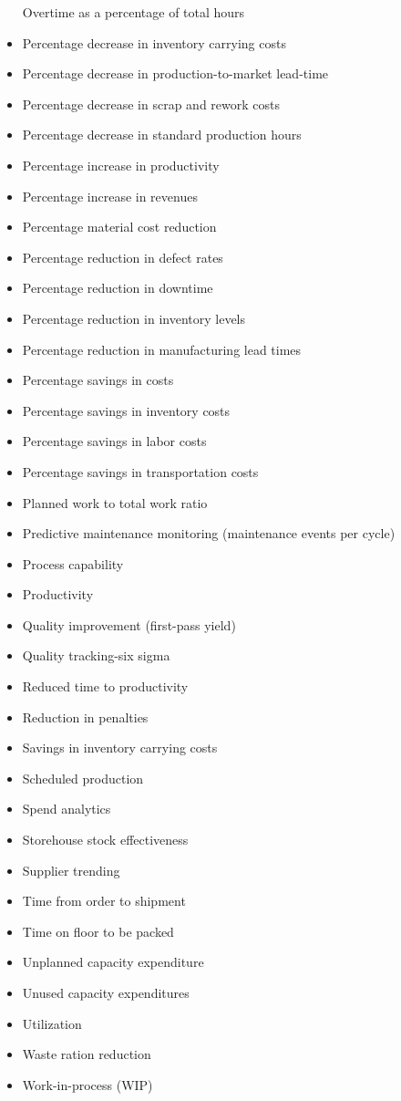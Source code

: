 \documentclass[]{book}
\begin{document}
\begin{itemize}
  Overtime as a percentage of total hours
\item
  Percentage decrease in inventory carrying costs
\item
  Percentage decrease in production-to-market lead-time
\item
  Percentage decrease in scrap and rework costs
\item
  Percentage decrease in standard production hours
\item
  Percentage increase in productivity
\item
  Percentage increase in revenues
\item
  Percentage material cost reduction
\item
  Percentage reduction in defect rates
\item
  Percentage reduction in downtime
\item
  Percentage reduction in inventory levels
\item
  Percentage reduction in manufacturing lead times
\item
  Percentage savings in costs
\item
  Percentage savings in inventory costs
\item
  Percentage savings in labor costs
\item
  Percentage savings in transportation costs
\item
  Planned work to total work ratio
\item
  Predictive maintenance monitoring (maintenance events per cycle)
\item
  Process capability
\item
  Productivity
\item
  Quality improvement (first-pass yield)
\item
  Quality tracking-six sigma
\item
  Reduced time to productivity
\item
  Reduction in penalties
\item
  Savings in inventory carrying costs
\item
  Scheduled production
\item
  Spend analytics
\item
  Storehouse stock effectiveness
\item
  Supplier trending
\item
  Time from order to shipment
\item
  Time on floor to be packed
\item
  Unplanned capacity expenditure
\item
  Unused capacity expenditures
\item
  Utilization
\item
  Waste ration reduction
\item
  Work-in-process (WIP)
\end{itemize}
\end{document}
